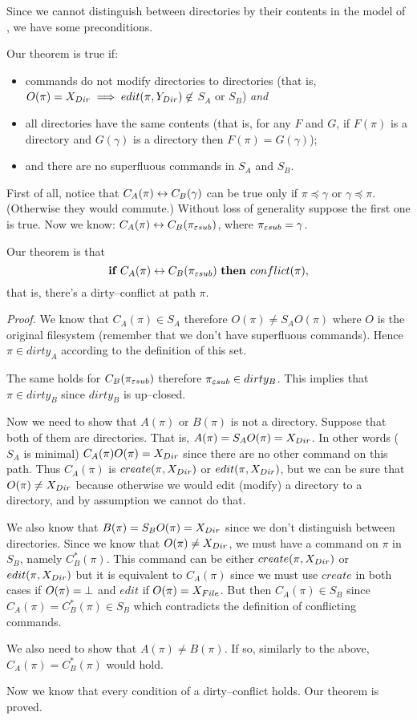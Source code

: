 Since we cannot distinguish between directories by their contents in the
model of \BP, we have some preconditions.

Our theorem is true if:
\begin{itemize}
\item commands do not modify directories to directories (that is,
\(O(\pi)=X_{Dir}\implies edit(\pi,Y_{Dir})\not\in\) \(S_A\) or
\(S_B\)) 
\emph{and}
\item all directories have the same contents (that is, for any \(F\) and
\(G\), if
\(F(\pi)\) is a directory and \(G(\gamma)\) is a directory then
\(F(\pi)=G(\gamma)\));
\item and there are no superfluous commands in \(S_A\) and \(S_B\).
\end{itemize} 

First of all, notice that \(C_A(\pi)\leftrightarrow C_B(\gamma)\) can be true only
if \(\pi\preceq\gamma\) or \(\gamma\preceq\pi\). (Otherwise they
would commute.) Without loss of generality suppose the first
one is true. Now we know: \(C_A(\pi)\leftrightarrow C_B(\pi_{\varepsilon sub})\), where
\(\pi_{\varepsilon sub}=\gamma\).

Our theorem is that 
\[\mbox{\bf if~} C_A(\pi)\leftrightarrow C_B(\pi_{\varepsilon sub}) \mbox{~\bf then~}
conflict(\pi),\]
that is, there's a dirty--conflict at path \(\pi\).

\emph{Proof.} We know that \(C_A(\pi)\in S_A\) therefore 
\(O(\pi)\neq S_AO(\pi)\) where \(O\) is the original filesystem (remember
that we don't have superfluous commands). 
Hence \(\pi\in dirty_A\) according to the definition of this set.

The same holds for \(C_B(\pi_{\varepsilon sub})\) therefore \(\pi_{\varepsilon sub}\in dirty_B\). This
implies that \(\pi\in dirty_B\) since \(dirty_B\) is up--closed.

Now we need to show that \(A(\pi)\) or \(B(\pi)\) is not a
directory. Suppose that both of them are directories. That is,
\(A(\pi)=S_AO(\pi)=X_{Dir}\). In other words (\(S_A\) is
minimal) \(C_A(\pi)O(\pi)=X_{Dir}\) since there are no other
command on this path. 
Thus \(C_A(\pi)\) is \(create(\pi,X_{Dir})\) 
or \(edit(\pi,X_{Dir})\), but we can be sure that 
\(O(\pi)\neq X_{Dir}\) because otherwise we would edit (modify) a
directory to a directory, and by assumption we cannot do that.

We also know that \(B(\pi)=S_BO(\pi)=X_{Dir}\) since we don't distinguish
between directories. Since we know that \(O(\pi)\neq X_{Dir}\),
we must have a command on \(\pi\) in \(S_B\), namely \(C_B^*(\pi)\). 
This command can be either \(create(\pi,X_{Dir})\) or
\(edit(\pi,X_{Dir})\) but it is equivalent to \(C_A(\pi)\) since
we must use \(create\) in both cases if \(O(\pi)=\bot\) and \(edit\) if
\(O(\pi)=X_{File}\). But then \(C_A(\pi)\in S_B\) since
\(C_A(\pi)=C_B^*(\pi)\in S_B\) which
contradicts the definition of conflicting commands.

We also need to show that \(A(\pi)\neq B(\pi)\). If so, similarly
to the above, \(C_A(\pi)=C_B^*(\pi)\) would hold.

Now we know that every condition of a dirty--conflict holds. Our theorem
is proved.
